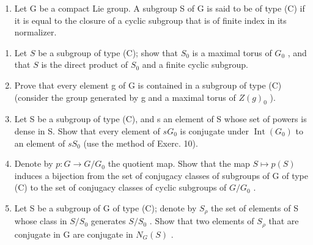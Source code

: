\begin{enumerate}
\def\labelenumi{\arabic{enumi})}
\setcounter{enumi}{10}
\tightlist
\item
  Let G be a compact Lie group. A subgroup S of G is said to be of type (C) if it is equal to the closure of a cyclic subgroup that is of finite index in its normalizer.
\end{enumerate}

\begin{enumerate}
\def\labelenumi{\alph{enumi})}
\item
  Let \(S\) be a subgroup of type (C); show that \(S_0\) is a maximal torus of \(G_0\) , and that \(S\) is the direct product of \(S_0\) and a finite cyclic subgroup.
\item
  Prove that every element g of G is contained in a subgroup of type (C) (consider the group generated by g and a maximal torus of \(Z(g)_{0}\) ).
\item
  Let S be a subgroup of type (C), and s an element of S whose set of powers is dense in S. Show that every element of \(sG_{0}\) is conjugate under \(\operatorname{Int}(G_{0})\) to an element of \(sS_{0}\) (use the method of Exerc. 10).
\item
  Denote by \(p: G \to G/G_{0}\) the quotient map. Show that the map \(S \mapsto p(S)\) induces a bijection from the set of conjugacy classes of subgroups of G of type (C) to the set of conjugacy classes of cyclic subgroups of \(G/G_{0}\) .
\item
  Let S be a subgroup of G of type (C); denote by \(S_{\rho}\) the set of elements of S whose class in \(S/S_{0}\) generates \(S/S_{0}\) . Show that two elements of \(S_{\rho}\) that are conjugate in G are conjugate in \(N_{G}(S)\) .
\end{enumerate}